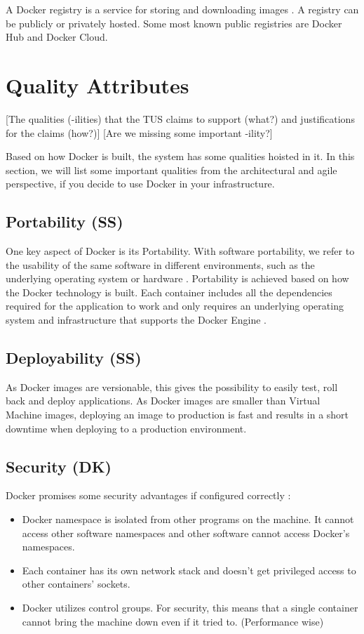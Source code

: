\documentclass[fleqn,12pt]{olplainarticle}
\begin{document}
A Docker registry is a service for storing and downloading images \citep{aquasec:docker_architecture}. A registry can be publicly or privately hosted. Some most known public registries are Docker Hub and Docker Cloud.

\section{Quality Attributes}

[The qualities (-ilities) that the TUS claims to support (what?) and justifications for the claims (how?)]
[Are we missing some important -ility?]

Based on how Docker is built, the system has some qualities hoisted in it. In this section, we will list some important qualities from the architectural and agile perspective, if you decide to use Docker in your infrastructure. 

\subsection{Portability (SS)}
One key aspect of Docker is its Portability. With software portability, we refer to the usability of the same software in different environments, such as the underlying operating system or hardware \citep{wiki:Software_portability}. Portability is achieved based on how the Docker technology is built. Each container includes all the dependencies required for the application to work and only requires an underlying operating system and infrastructure that supports the Docker Engine \citep{hy:DevOps_with_Docker}.

\subsection{Deployability (SS)}
As Docker images are versionable, this gives the possibility to easily test, roll back and deploy applications\citep{hentsu:benefits}. As Docker images are smaller than Virtual Machine images, deploying an image to production is fast and results in a short downtime when deploying to a production environment. 

\subsection{Security (DK)}
Docker promises some security advantages if configured correctly \citep{docker:security}:
\begin{itemize}
    \item  Docker namespace is isolated from other programs on the machine. It cannot access other software namespaces and other software cannot access Docker's namespaces. 
    \item Each container has its own network stack and doesn't get privileged access to other containers' sockets.
    \item Docker utilizes control groups. For security, this means that a single container cannot bring the machine down even if it tried to. (Performance wise)
    
\end{itemize}
\end{document}
